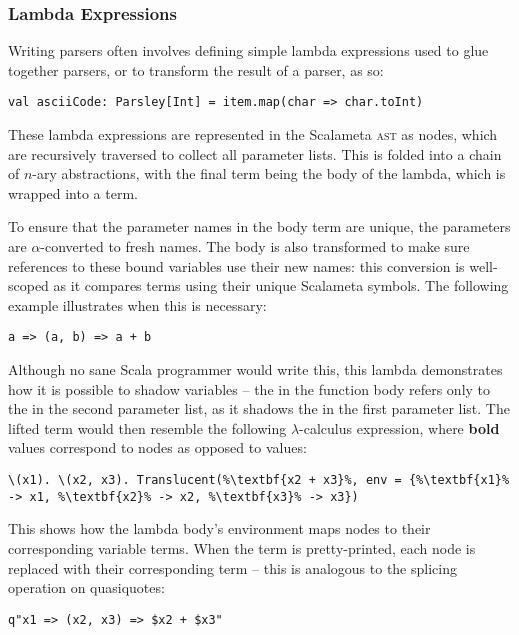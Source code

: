 \documentclass[../../../main.tex]{subfiles}
\begin{document}
\subsubsection{Lambda Expressions}
Writing parsers often involves defining simple lambda expressions used to glue together parsers, or to transform the result of a parser, as so:
\begin{verbatim}
val asciiCode: Parsley[Int] = item.map(char => char.toInt)
\end{verbatim}
%
These lambda expressions are represented in the Scalameta \textsc{ast} as  nodes, which are recursively traversed to collect all parameter lists.
This is folded into a chain of $n$-ary abstractions, with the final term being the body of the lambda, which is wrapped into a  term.

To ensure that the parameter names in the  body term are unique, the parameters are $\alpha$-converted to fresh names.
The body is also transformed to make sure references to these bound variables use their new names: this conversion is well-scoped as it compares terms using their unique Scalameta symbols.
The following example illustrates when this is necessary:
\begin{verbatim}
a => (a, b) => a + b
\end{verbatim}
Although no sane Scala programmer would write this, this lambda demonstrates how it is possible to shadow variables -- the  in the function body refers only to the  in the second parameter list, as it shadows the  in the first parameter list.
The lifted  term would then resemble the following $\lambda$-calculus expression, where \textbf{bold} values correspond to  nodes as opposed to  values:
\begin{lstlisting}
\(x1). \(x2, x3). Translucent(%\textbf{x2 + x3}%, env = {%\textbf{x1}% -> x1, %\textbf{x2}% -> x2, %\textbf{x3}% -> x3})
\end{lstlisting}
This shows how the lambda body's environment maps  nodes to their corresponding variable terms.
When the term is pretty-printed, each  node is replaced with their corresponding  term -- this is analogous to the splicing operation on quasiquotes:
\begin{verbatim}
q"x1 => (x2, x3) => $x2 + $x3"
\end{verbatim}
\end{document}

